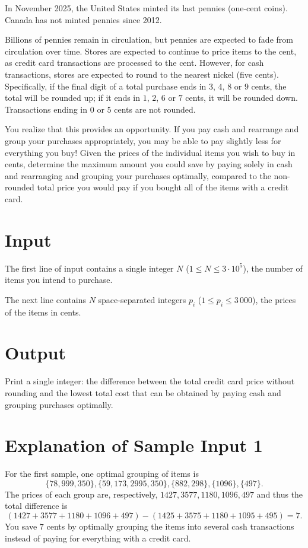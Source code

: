 
\newcommand{\hmaxn}{3 \cdot 10^{5}}
\newcommand{\hmaxp}{3\,000}

In November 2025, the United States minted its last pennies (one-cent
coins).  Canada has not minted pennies since 2012.

Billions of pennies remain in circulation, but pennies are
expected to fade from circulation over time.  Stores are expected to
continue to price items to the cent, as credit card transactions are
processed to the cent.  However, for cash transactions, stores are
expected to round to the nearest nickel (five cents).  Specifically, if
the final digit of a total purchase ends in $3$, $4$, $8$ or $9$ cents, the
total will be rounded up; if it ends in $1$, $2$, $6$ or $7$ cents, it will be
rounded down. Transactions ending in $0$ or $5$ cents are not rounded.

You realize that this provides an opportunity.  If you pay cash and
rearrange and group your purchases appropriately, you may be able to pay slightly
less for everything you buy!  Given the prices of the individual
items you wish to buy in cents, determine the maximum amount you could save by paying
solely in cash and rearranging and grouping your purchases optimally, compared to the
non-rounded total price you would pay if you bought all of the items 
with a credit card.

\section*{Input}
The first line of input contains a single integer $N$ ($1 \le N \le \hmaxn$), the number of items you intend to purchase.

The next line contains $N$ space-separated integers $p_i$ ($1\le p_i\le \hmaxp$), the prices of the items in cents.

\section*{Output}
Print a single integer: the difference between the total credit card price without
rounding and the lowest total cost that can be obtained by paying cash
and grouping purchases optimally.

\section*{Explanation of Sample Input 1}

For the first sample, one optimal grouping of items is
\[\{78, 999, 350\}, \{59, 173, 2995, 350\}, \{882, 298\}, \{1096\}, \{497\}.\]
The prices of each group are, respectively, $1427, 3577, 1180, 1096, 497$ and thus the total difference is
\[(1427 + 3577 + 1180 + 1096 + 497) - (1425 + 3575 + 1180 + 1095 + 495) = 7.\] 
You save $7$ cents by optimally grouping the items into several cash transactions instead of paying for everything with a credit card.

